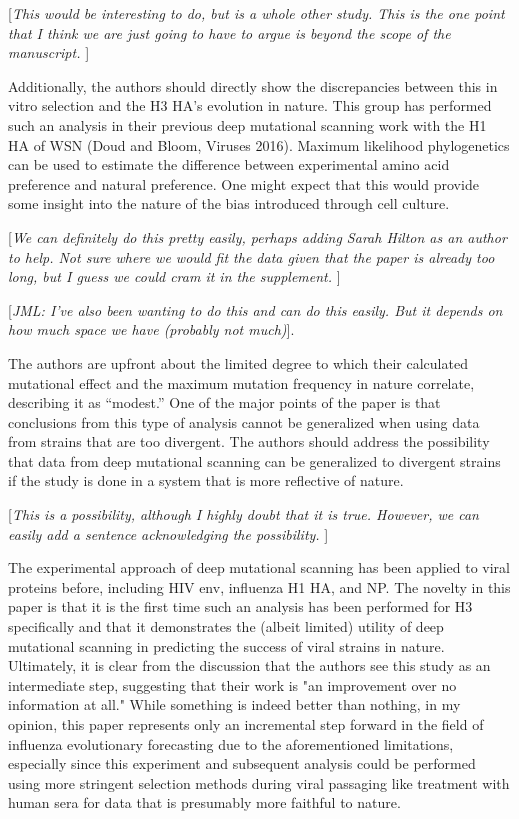 \documentclass[11pt, oneside]{article}   	%
\newcommand{\comment}[1]{{\color{red}[\textsl{#1}]}}
\begin{document}
\comment{This would be interesting to do, but is a whole other study.
This is the one point that I think we are just going to have to argue is beyond the scope of the manuscript.
}

Additionally, the authors should directly show the discrepancies between this in vitro selection and the H3 HA's evolution in nature. This group has performed such an analysis in their previous deep mutational scanning work with the H1 HA of WSN (Doud and Bloom, Viruses 2016). Maximum likelihood phylogenetics can be used to estimate the difference between experimental amino acid preference and natural preference. One might expect that this would provide some insight into the nature of the bias introduced through cell culture. 

\comment{We can definitely do this pretty easily, perhaps adding Sarah Hilton as an author to help.
Not sure where we would fit the data given that the paper is already too long, but I guess we could cram it in the supplement.
}

\comment{JML: I've also been wanting to do this and can do this easily. But it depends on how much space we have (probably not much)}.

The authors are upfront about the limited degree to which their calculated mutational effect and the maximum mutation frequency in nature correlate, describing it as ``modest.'' One of the major points of the paper is that conclusions from this type of analysis cannot be generalized when using data from strains that are too divergent. The authors should address the possibility that data from deep mutational scanning can be generalized to divergent strains if the study is done in a system that is more reflective of nature. 

\comment{This is a possibility, although I highly doubt that it is true.
However, we can easily add a sentence acknowledging the possibility.
}

The experimental approach of deep mutational scanning has been applied to viral proteins before, including HIV env, influenza H1 HA, and NP. The novelty in this paper is that it is the first time such an analysis has been performed for H3 specifically and that it demonstrates the (albeit limited) utility of deep mutational scanning in predicting the success of viral strains in nature. Ultimately, it is clear from the discussion that the authors see this study as an intermediate step, suggesting that their work is "an improvement over no information at all." While something is indeed better than nothing, in my opinion, this paper represents only an incremental step forward in the field of influenza evolutionary forecasting due to the aforementioned limitations, especially since this experiment and subsequent analysis could be performed using more stringent selection methods during viral passaging like treatment with human sera for data that is presumably more faithful to nature. 
\end{document}
